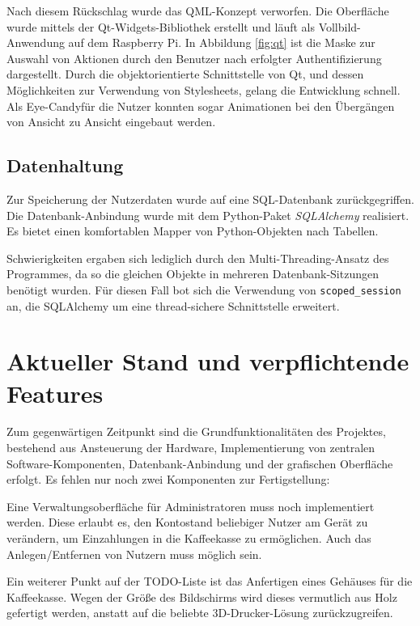 \documentclass[11pt,a4paper]{IEEEtran}
\begin{document}
Nach diesem Rückschlag wurde das QML-Konzept verworfen. Die Oberfläche wurde
mittels der Qt-Widgets-Bibliothek erstellt und läuft als Vollbild-Anwendung 
auf dem Raspberry Pi. In Abbildung \ref{fig:qt} ist die Maske zur Auswahl von
Aktionen durch den Benutzer nach erfolgter Authentifizierung dargestellt. Durch
die objektorientierte Schnittstelle von Qt, und dessen Möglichkeiten zur
Verwendung von Stylesheets, gelang die Entwicklung schnell. Als 
\glqq Eye-Candy\grqq{ }für die Nutzer konnten sogar Animationen bei den Übergängen von Ansicht
zu Ansicht eingebaut werden.

\subsection{Datenhaltung}

Zur Speicherung der Nutzerdaten wurde auf eine SQL-Datenbank zurückgegriffen.
Die Datenbank-Anbindung wurde mit dem Python-Paket
\emph{SQLAlchemy}\autocite{SQLAlchemy} realisiert. Es bietet einen komfortablen
Mapper von Python-Objekten nach Tabellen. 

Schwierigkeiten ergaben sich lediglich durch den Multi-Threading-Ansatz des 
Programmes, da so die gleichen Objekte in mehreren Datenbank-Sitzungen benötigt
wurden. Für diesen Fall bot sich die Verwendung von \texttt{scoped\_session}
an, die SQLAlchemy um eine thread-sichere Schnittstelle erweitert.

\section{Aktueller Stand und verpflichtende Features}

Zum gegenwärtigen Zeitpunkt sind die Grundfunktionalitäten des Projektes,
bestehend aus Ansteuerung der Hardware, Implementierung von zentralen 
Software-Komponenten, Datenbank-Anbindung und der grafischen Oberfläche 
erfolgt. Es fehlen nur noch zwei Komponenten zur Fertigstellung:

Eine Verwaltungsoberfläche für Administratoren muss noch implementiert werden.
Diese erlaubt es, den Kontostand beliebiger Nutzer am Gerät zu verändern, um
Einzahlungen in die Kaffeekasse zu ermöglichen. Auch das Anlegen/Entfernen
von Nutzern muss möglich sein.

Ein weiterer Punkt auf der TODO-Liste ist das Anfertigen eines Gehäuses für die
Kaffeekasse. Wegen der Größe des Bildschirms wird dieses vermutlich aus Holz
gefertigt werden, anstatt auf die beliebte 3D-Drucker-Lösung zurückzugreifen.
\end{document}
